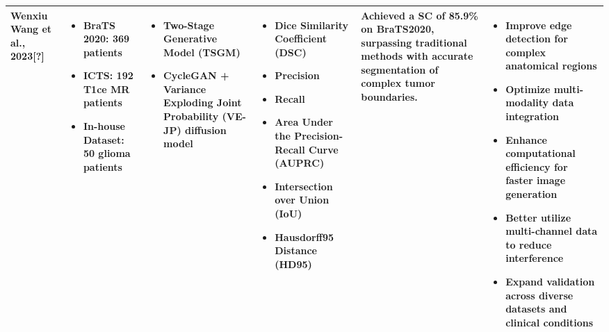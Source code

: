 \documentclass[12pt]{article}
\begin{document}
\begin{longtable}{|>{\RaggedRight}p{2.5cm}|>{\RaggedRight}p{2.8cm}|>{\RaggedRight}p{4cm}|>{\RaggedRight}p{2.8cm}|>{\RaggedRight}p{3.2cm}|>{\RaggedRight}p{3.5cm}|}
Wenxiu Wang et al., 2023[?] & 
\begin{itemize}[leftmargin=8pt, itemsep=1pt, parsep=0pt]
\item BraTS 2020: 369 patients
\item ICTS: 192 T1ce MR patients
\item In-house Dataset: 50 glioma patients
\end{itemize} & 
\begin{itemize}[leftmargin=8pt, itemsep=1pt, parsep=0pt]
\item Two-Stage Generative Model (TSGM)
\item CycleGAN + Variance Exploding Joint Probability (VE-JP) diffusion model
\end{itemize} & 
\begin{itemize}[leftmargin=8pt, itemsep=1pt, parsep=0pt]
\item Dice Similarity Coefficient (DSC)
\item Precision
\item Recall
\item Area Under the Precision-Recall Curve (AUPRC)
\item Intersection over Union (IoU)
\item Hausdorff95 Distance (HD95)
\end{itemize} & 
Achieved a SC of 85.9\% on BraTS2020, surpassing traditional methods with accurate segmentation of complex tumor boundaries. & 
\begin{itemize}[leftmargin=8pt, itemsep=1pt, parsep=0pt]
\item Improve edge detection for complex anatomical regions
\item Optimize multi-modality data integration
\item Enhance computational efficiency for faster image generation
\item Better utilize multi-channel data to reduce interference
\item Expand validation across diverse datasets and clinical conditions
\end{itemize} \\
\hline


\end{longtable}
\end{document}
